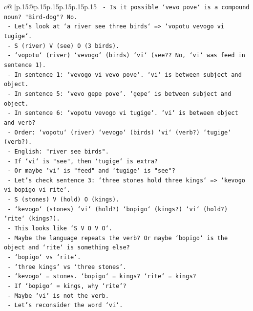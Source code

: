 \documentclass{article}
\begin{document}
{\begin{supertabular}{c@{$\;$}|p{.15\linewidth}@{}p{.15\linewidth}p{.15\linewidth}p{.15\linewidth}p{.15\linewidth}p{.15\linewidth}}
{{{\texttt{         {-} Is it possible `vevo pove` is a compound noun? "Bird{-}dog"? No.} \\
\texttt{         {-} Let's look at `a river see three birds` => `vopotu vevogo vi tugige`.} \\
\texttt{           {-} S (river) V (see) O (3 birds).} \\
\texttt{           {-} `vopotu` (river) `vevogo` (birds) `vi` (see?? No, `vi` was feed in sentence 1).} \\
\texttt{           {-} In sentence 1: `vevogo vi vevo pove`. `vi` is between subject and object.} \\
\texttt{           {-} In sentence 5: `vevo gepe pove`. `gepe` is between subject and object.} \\
\texttt{           {-} In sentence 6: `vopotu vevogo vi tugige`. `vi` is between object and verb?} \\
\texttt{             {-} Order: `vopotu` (river) `vevogo` (birds) `vi` (verb?) `tugige` (verb?).} \\
\texttt{             {-} English: "river see birds".} \\
\texttt{             {-} If `vi` is "see", then `tugige` is extra?} \\
\texttt{             {-} Or maybe `vi` is "feed" and `tugige` is "see"?} \\
\texttt{             {-} Let's check sentence 3: `three stones hold three kings` => `kevogo vi bopigo vi rite`.} \\
\texttt{               {-} S (stones) V (hold) O (kings).} \\
\texttt{               {-} `kevogo` (stones) `vi` (hold?) `bopigo` (kings?) `vi` (hold?) `rite` (kings?).} \\
\texttt{               {-} This looks like `S V O V O`.} \\
\texttt{               {-} Maybe the language repeats the verb? Or maybe `bopigo` is the object and `rite` is something else?} \\
\texttt{               {-} `bopigo` vs `rite`.} \\
\texttt{               {-} `three kings` vs `three stones`.} \\
\texttt{               {-} `kevogo` = stones. `bopigo` = kings? `rite` = kings?} \\
\texttt{               {-} If `bopigo` = kings, why `rite`?} \\
\texttt{               {-} Maybe `vi` is not the verb.} \\
\texttt{               {-} Let's reconsider the word `vi`.} \\
}}}
\end{supertabular}}
\end{document}
